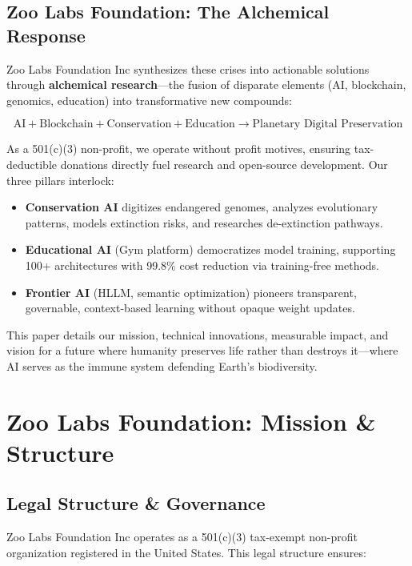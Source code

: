 \documentclass[twocolumn,11pt]{article}
\begin{document}
\subsection{Zoo Labs Foundation: The Alchemical Response}

Zoo Labs Foundation Inc synthesizes these crises into actionable solutions through \textbf{alchemical research}—the fusion of disparate elements (AI, blockchain, genomics, education) into transformative new compounds:

\begin{equation}
\text{AI} + \text{Blockchain} + \text{Conservation} + \text{Education} \rightarrow \text{Planetary Digital Preservation}
\end{equation}

As a 501(c)(3) non-profit, we operate without profit motives, ensuring tax-deductible donations directly fuel research and open-source development. Our three pillars interlock:

\begin{itemize}
    \item \textbf{Conservation AI} digitizes endangered genomes, analyzes evolutionary patterns, models extinction risks, and researches de-extinction pathways.
    \item \textbf{Educational AI} (Gym platform) democratizes model training, supporting 100+ architectures with 99.8\% cost reduction via training-free methods.
    \item \textbf{Frontier AI} (HLLM, semantic optimization) pioneers transparent, governable, context-based learning without opaque weight updates.
\end{itemize}

This paper details our mission, technical innovations, measurable impact, and vision for a future where humanity preserves life rather than destroys it—where AI serves as the immune system defending Earth's biodiversity.

\section{Zoo Labs Foundation: Mission \& Structure}

\subsection{Legal Structure \& Governance}

Zoo Labs Foundation Inc operates as a 501(c)(3) tax-exempt non-profit organization registered in the United States. This legal structure ensures:
\end{document}
